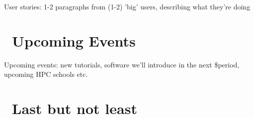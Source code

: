 \documentclass{article}
\begin{document}
User stories: 1-2 paragraphs from (1-2) 'big' users, describing what
they're doing

\section{\faCalendar\ Upcoming Events}
Upcoming events: new tutorials, software we'll introduce in the next
\$period, upcoming HPC schools etc.

\section{\faBeer\ Last but not least}

\lipsum[2-8]
\end{document}
